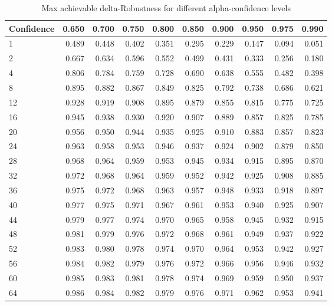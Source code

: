 \begin{table}
\centering
\caption{Max achievable delta-Robustness for different alpha-confidence levels}
\label{tab:maxdelta}
\begin{tabular}{lrrrrrrrrr}
\toprule
Confidence &  0.650 &  0.700 &  0.750 &  0.800 &  0.850 &  0.900 &  0.950 &  0.975 &  0.990 \\
\midrule
1   &  0.489 &  0.448 &  0.402 &  0.351 &  0.295 &  0.229 &  0.147 &  0.094 &  0.051 \\
2   &  0.667 &  0.634 &  0.596 &  0.552 &  0.499 &  0.431 &  0.333 &  0.256 &  0.180 \\
4   &  0.806 &  0.784 &  0.759 &  0.728 &  0.690 &  0.638 &  0.555 &  0.482 &  0.398 \\
8   &  0.895 &  0.882 &  0.867 &  0.849 &  0.825 &  0.792 &  0.738 &  0.686 &  0.621 \\
12  &  0.928 &  0.919 &  0.908 &  0.895 &  0.879 &  0.855 &  0.815 &  0.775 &  0.725 \\
16  &  0.945 &  0.938 &  0.930 &  0.920 &  0.907 &  0.889 &  0.857 &  0.825 &  0.785 \\
20  &  0.956 &  0.950 &  0.944 &  0.935 &  0.925 &  0.910 &  0.883 &  0.857 &  0.823 \\
24  &  0.963 &  0.958 &  0.953 &  0.946 &  0.937 &  0.924 &  0.902 &  0.879 &  0.850 \\
28  &  0.968 &  0.964 &  0.959 &  0.953 &  0.945 &  0.934 &  0.915 &  0.895 &  0.870 \\
32  &  0.972 &  0.968 &  0.964 &  0.959 &  0.952 &  0.942 &  0.925 &  0.908 &  0.885 \\
36  &  0.975 &  0.972 &  0.968 &  0.963 &  0.957 &  0.948 &  0.933 &  0.918 &  0.897 \\
40  &  0.977 &  0.975 &  0.971 &  0.967 &  0.961 &  0.953 &  0.940 &  0.925 &  0.907 \\
44  &  0.979 &  0.977 &  0.974 &  0.970 &  0.965 &  0.958 &  0.945 &  0.932 &  0.915 \\
48  &  0.981 &  0.979 &  0.976 &  0.972 &  0.968 &  0.961 &  0.949 &  0.937 &  0.922 \\
52  &  0.983 &  0.980 &  0.978 &  0.974 &  0.970 &  0.964 &  0.953 &  0.942 &  0.927 \\
56  &  0.984 &  0.982 &  0.979 &  0.976 &  0.972 &  0.966 &  0.956 &  0.946 &  0.932 \\
60  &  0.985 &  0.983 &  0.981 &  0.978 &  0.974 &  0.969 &  0.959 &  0.950 &  0.937 \\
64  &  0.986 &  0.984 &  0.982 &  0.979 &  0.976 &  0.971 &  0.962 &  0.953 &  0.941 \\

\end{tabular}
\end{table}
